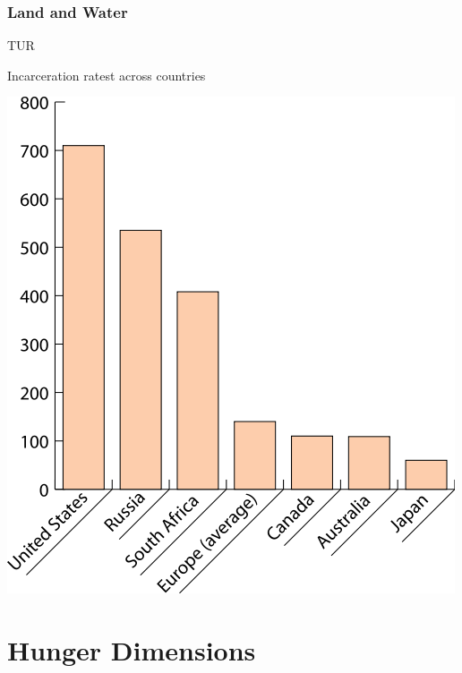 \documentclass[print,Draft]{faosyb}
\begin{document}
\lipsum[1-8]

\section{Land and Water}

\lipsum[1-4]

\begin{chart}{T}{UR}
\caption{Incarceration ratest across countries}
\label{chart:incarceration}
\includegraphics[width=\chartwidth,height=\chartheight]{incarceration}  
\end{chart}

\lipsum[2-16]


\begin{tablepages}
\small
  
\clearpage

\clearpage

\clearpage

\end{tablepages}

\part{Hunger Dimensions}
\lipsum
\EndPartIntro
\end{document}
